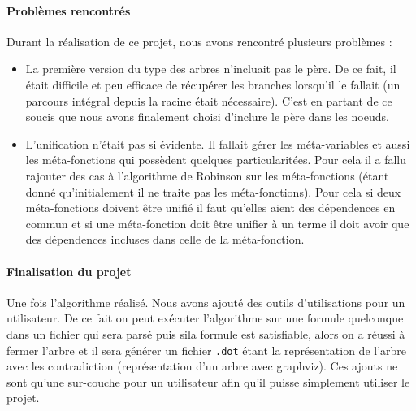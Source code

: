\documentclass{report}
\begin{document}
\paragraph{Problèmes rencontrés}
Durant la réalisation de ce projet, nous avons rencontré plusieurs problèmes :
\begin{itemize}
  \item La première version du type des arbres n'incluait pas le père. De ce fait, il était difficile et peu efficace de récupérer les branches lorsqu'il le fallait (un parcours intégral depuis la racine était nécessaire). C'est en partant de ce soucis que nous avons finalement choisi d'inclure le père dans les noeuds.
  \item L'unification n'était pas si évidente. Il fallait gérer les méta-variables et aussi les méta-fonctions qui possèdent quelques particularitées. Pour cela il a fallu rajouter des cas à l'algorithme de Robinson sur les méta-fonctions (étant donné qu'initialement il ne traite pas les méta-fonctions). Pour cela si deux méta-fonctions doivent être unifié il faut qu'elles aient des dépendences en commun et si une méta-fonction doit être unifier à un terme il doit avoir que des dépendences incluses dans celle de la méta-fonction.
\end{itemize}

\paragraph{Finalisation du projet}
Une fois l'algorithme réalisé. Nous avons ajouté des outils d'utilisations pour un utilisateur. De ce fait on peut exécuter l'algorithme sur une formule quelconque dans un fichier qui sera parsé puis sila formule est satisfiable, alors on a réussi à fermer l'arbre et il sera générer un fichier \verb|.dot| étant la représentation de l'arbre avec les contradiction (représentation d'un arbre avec graphviz). Ces ajouts ne sont qu'une sur-couche pour un utilisateur afin qu'il puisse simplement utiliser le projet.
\end{document}
